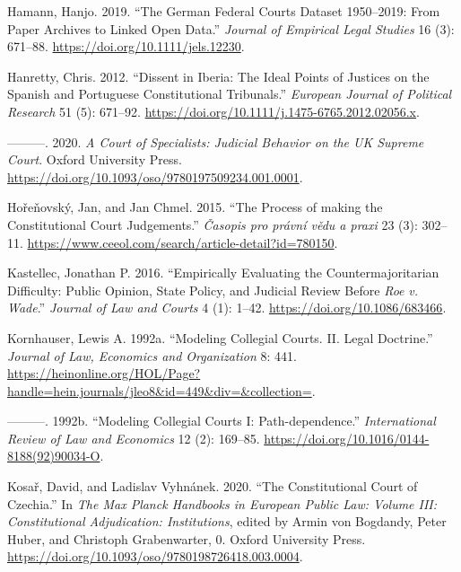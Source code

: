 \documentclass[
  11pt,
]{article}
\newlength{\cslhangindent}
\newenvironment{CSLReferences}[2] %
 {%
  \setlength{\parindent}{0pt}
  \ifodd #1 \everypar{\setlength{\hangindent}{\cslhangindent}}\ignorespaces\fi
  \ifnum #2 > 0
  \setlength{\parskip}{#2\baselineskip}
  \fi
 }%
 {}
\begin{document}
\begin{CSLReferences}{1}{0}
\leavevmode{}%
Hamann, Hanjo. 2019. {``The {German Federal Courts Dataset} 1950--2019:
{From Paper Archives} to {Linked Open Data}.''} \emph{Journal of
Empirical Legal Studies} 16 (3): 671--88.
\url{https://doi.org/10.1111/jels.12230}.

\leavevmode{}%
Hanretty, Chris. 2012. {``Dissent in {Iberia}: {The} Ideal Points of
Justices on the {Spanish} and {Portuguese Constitutional Tribunals}.''}
\emph{European Journal of Political Research} 51 (5): 671--92.
\url{https://doi.org/10.1111/j.1475-6765.2012.02056.x}.

\leavevmode{}%
---------. 2020. \emph{A {Court} of {Specialists}: {Judicial Behavior}
on the {UK Supreme Court}}. {Oxford University Press}.
\url{https://doi.org/10.1093/oso/9780197509234.001.0001}.

\leavevmode{}%
Hořeňovský, Jan, and Jan Chmel. 2015. {``The Process of making the
Constitutional Court Judgements.''} \emph{Časopis pro právní vědu a
praxi} 23 (3): 302--11.
\url{https://www.ceeol.com/search/article-detail?id=780150}.

\leavevmode{}%
Kastellec, Jonathan P. 2016. {``Empirically {Evaluating} the
{Countermajoritarian Difficulty}: {Public Opinion}, {State Policy}, and
{Judicial Review} Before {\emph{Roe}}{ \emph{v.} }{\emph{Wade}}.''}
\emph{Journal of Law and Courts} 4 (1): 1--42.
\url{https://doi.org/10.1086/683466}.

\leavevmode{}%
Kornhauser, Lewis A. 1992a. {``Modeling {Collegial Courts}. {II}. {Legal
Doctrine}.''} \emph{Journal of Law, Economics and Organization} 8: 441.
\url{https://heinonline.org/HOL/Page?handle=hein.journals/jleo8&id=449&div=&collection=}.

\leavevmode{}%
---------. 1992b. {``Modeling Collegial Courts {I}:
{Path-dependence}.''} \emph{International Review of Law and Economics}
12 (2): 169--85. \url{https://doi.org/10.1016/0144-8188(92)90034-O}.

\leavevmode{}%
Kosař, David, and Ladislav Vyhnánek. 2020. {``The {Constitutional Court}
of {Czechia}.''} In \emph{The {Max Planck Handbooks} in {European Public
Law}: {Volume III}: {Constitutional Adjudication}: {Institutions}},
edited by Armin von Bogdandy, Peter Huber, and Christoph Grabenwarter,
0. {Oxford University Press}.
\url{https://doi.org/10.1093/oso/9780198726418.003.0004}.


\end{CSLReferences}
\end{document}
